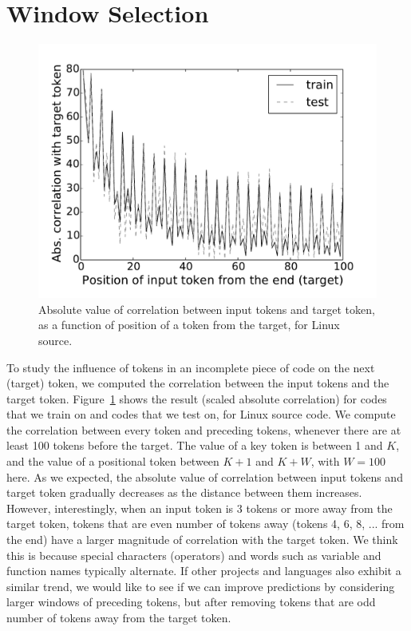 \section{Window Selection}
\label{sec:window}

\begin{figure}
  \centering
  \includegraphics[width=\linewidth]{figs/correlation.pdf}
  \caption{Absolute value of correlation between input tokens and target token,
    as a function of position of a token from the target, for Linux source.}
  \label{fig:correlation}
\end{figure}

\noindent
To study the influence of tokens in an incomplete piece of code on the next
(target) token, we computed the correlation between the input tokens and the
target token.
Figure~\ref{fig:correlation} shows the result (scaled absolute correlation) for
codes that we train on and codes that we test on, for Linux
source code.
We compute the correlation between every token and preceding tokens, whenever
there are at least 100 tokens before the target.
The value of a key token is between 1 and $K$, and the value of a positional
token between $K+1$ and $K+W$, with $W=100$ here.
As we expected, the absolute value of correlation between input tokens and
target token gradually decreases as the distance between them increases.
However, interestingly, when an input token is 3 tokens or more away from the
target token, tokens that are even number of tokens away (tokens 4, 6, 8, ...
from the end) have a larger magnitude of correlation with the target token.
We think this is because special characters (operators) and words such as variable and
function names typically alternate. If other projects and languages
also exhibit a similar trend, we would like to see if we can improve
predictions by considering larger windows of preceding tokens, but after
removing tokens that are odd number of tokens away from the target token.
